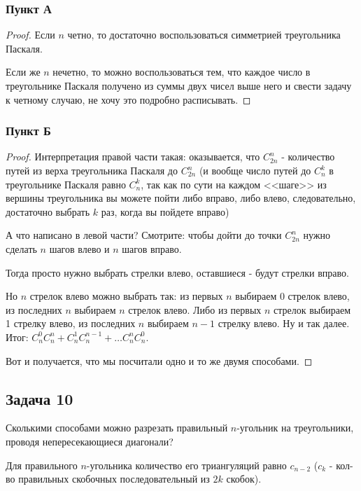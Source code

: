 \subsubsection{Пункт А}
\begin{proof}
    Если $n$ четно, то достаточно воспользоваться симметрией треугольника Паскаля.

    Если же $n$ нечетно, то можно воспользоваться тем, что каждое число в треугольнике Паскаля получено из суммы двух чисел выше него и свести задачу к четному случаю, не хочу это подробно расписывать.
\end{proof}

\subsubsection{Пункт Б}
\begin{proof}
Интерпретация правой части такая: оказывается, что $C^n_{2n}$ - количество путей из верха треугольника Паскаля до $C^n_{2n}$ (и вообще число путей до $C^k_{n}$ в треугольнике Паскаля равно $C^k_{n}$, так как по сути на каждом <<шаге>> из вершины треугольника вы можете пойти либо вправо, либо влево, следовательно, достаточно выбрать $k$ раз, когда вы пойдете вправо)

А что написано в левой части? Смотрите: чтобы дойти до точки $C^n_{2n}$ нужно сделать $n$ шагов влево и $n$ шагов вправо.

Тогда просто нужно выбрать стрелки влево, оставшиеся - будут стрелки вправо.

Но $n$ стрелок влево можно выбрать так: из первых $n$ выбираем 0 стрелок влево, из последних $n$ выбираем $n$ стрелок влево. Либо из первых $n$ стрелок выбираем 1 стрелку влево, из последних $n$ выбираем $n-1$ стрелку влево. Ну и так далее. Итог: $C^0_n C^n_n + C^1_n C^{n-1}_n + \ldots C^n_n C^0_n$.

Вот и получается, что мы посчитали одно и то же двумя способами.
\end{proof}

\subsection{Задача 10}
Сколькими способами можно разрезать правильный $n$-угольник на треугольники, проводя непересекающиеся диагонали?

\begin{claim*}
Для правильного $n$-угольника количество его триангуляций равно $c_{n-2}$ ($c_k$ - кол-во правильных скобочных последовательный из $2k$ скобок).
\end{claim*} 

